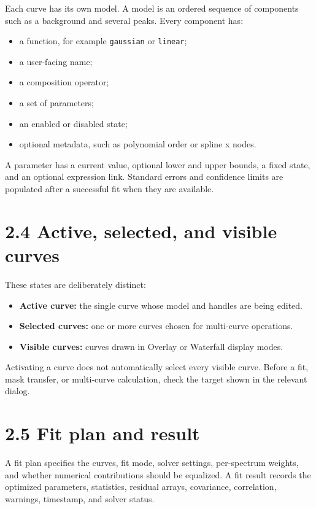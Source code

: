 \documentclass[
  10pt,
  a4paper,
  oneside]{scrreprt}
\providecommand{\tightlist}{%
  \setlength{\itemsep}{0pt}\setlength{\parskip}{0pt}}
\begin{document}
Each curve has its own model. A model is an ordered sequence of
components such as a background and several peaks. Every component has:

\begin{itemize}
\tightlist
\item
  a function, for example \texttt{gaussian} or \texttt{linear};
\item
  a user-facing name;
\item
  a composition operator;
\item
  a set of parameters;
\item
  an enabled or disabled state;
\item
  optional metadata, such as polynomial order or spline x nodes.
\end{itemize}

A parameter has a current value, optional lower and upper bounds, a
fixed state, and an optional expression link. Standard errors and
confidence limits are populated after a successful fit when they are
available.

\hypertarget{active-selected-and-visible-curves}{%
\section{2.4 Active, selected, and visible
curves}\label{active-selected-and-visible-curves}}

These states are deliberately distinct:

\begin{itemize}
\tightlist
\item
  \textbf{Active curve:} the single curve whose model and handles are
  being edited.
\item
  \textbf{Selected curves:} one or more curves chosen for multi-curve
  operations.
\item
  \textbf{Visible curves:} curves drawn in Overlay or Waterfall display
  modes.
\end{itemize}

Activating a curve does not automatically select every visible curve.
Before a fit, mask transfer, or multi-curve calculation, check the
target shown in the relevant dialog.

\hypertarget{fit-plan-and-result}{%
\section{2.5 Fit plan and result}\label{fit-plan-and-result}}

A fit plan specifies the curves, fit mode, solver settings, per-spectrum
weights, and whether numerical contributions should be equalized. A fit
result records the optimized parameters, statistics, residual arrays,
covariance, correlation, warnings, timestamp, and solver status.
\end{document}
